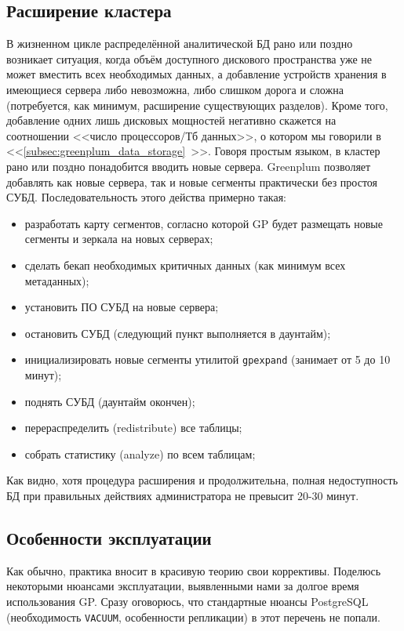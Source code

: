 \subsection{Расширение кластера}

В жизненном цикле распределённой аналитической БД рано или поздно возникает ситуация, когда объём доступного дискового пространства уже не может вместить всех необходимых данных, а добавление устройств хранения в имеющиеся сервера либо невозможна, либо слишком дорога и сложна (потребуется, как минимум, расширение существующих разделов). Кроме того, добавление одних лишь дисковых мощностей негативно скажется на соотношении <<число процессоров/Тб данных>>, о котором мы говорили в <<\ref{subsec:greenplum_data_storage}~>>. Говоря простым языком, в кластер рано или поздно понадобится вводить новые сервера. Greenplum позволяет добавлять как новые сервера, так и новые сегменты практически без простоя СУБД. Последовательность этого действа примерно такая:

\begin{itemize}
  \item разработать карту сегментов, согласно которой GP будет размещать новые сегменты и зеркала на новых серверах;
  \item сделать бекап необходимых критичных данных (как минимум всех метаданных);
  \item установить ПО СУБД на новые сервера;
  \item остановить СУБД (следующий пункт выполняется в даунтайм);
  \item инициализировать новые сегменты утилитой \lstinline!gpexpand! (занимает от 5 до 10 минут);
  \item поднять СУБД (даунтайм окончен);
  \item перераспределить (redistribute) все таблицы;
  \item собрать статистику (analyze) по всем таблицам;
\end{itemize}

Как видно, хотя процедура расширения и продолжительна, полная недоступность БД при правильных действиях администратора не превысит 20-30 минут.


\subsection{Особенности эксплуатации}

Как обычно, практика вносит в красивую теорию свои коррективы. Поделюсь некоторыми нюансами эксплуатации, выявленными нами за долгое время использования GP. Сразу оговорюсь, что стандартные нюансы PostgreSQL (необходимость \lstinline!VACUUM!, особенности репликации) в этот перечень не попали.

